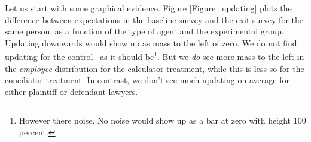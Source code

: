 \documentclass[11pt]{article}
\begin{document}
Let us start with some graphical evidence. Figure \ref{Figure_updating} plots the difference between expectations in the baseline survey and the exit survey for the same person, as a function of the type of agent and the experimental group. Updating downwards would show up as mass to the left of zero. We do not find updating for the control --as it should be\footnote{However there noise. No noise would show up as a bar at zero with height 100 percent.}. But we \textit{do} see more mass to the left in the \textit{employee} distribution for the calculator treatment, while this is less so for the conciliator treatment. In contrast, we don't see much updating on average for either plaintiff or defendant lawyers.


\end{document}
